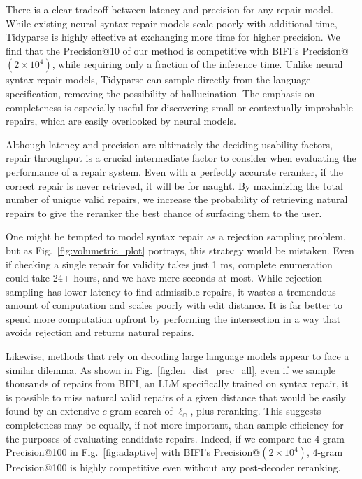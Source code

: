 \documentclass[sigplan,acmsmall,nonacm,screen]{acmart}\settopmatter{printfolios=false,printccs=false,printacmref=false}
\begin{document}
There is a clear tradeoff between latency and precision for any repair model. While existing neural syntax repair models scale poorly with additional time, Tidyparse is highly effective at exchanging more time for higher precision. We find that the Precision@10 of our method is competitive with BIFI's Precision@$(2\times 10^4)$, while requiring only a fraction of the inference time. Unlike neural syntax repair models, Tidyparse can sample directly from the language specification, removing the possibility of hallucination. The emphasis on completeness is especially useful for discovering small or contextually improbable repairs, which are easily overlooked by neural models.

Although latency and precision are ultimately the deciding usability factors, repair throughput is a crucial intermediate factor to consider when evaluating the performance of a repair system. Even with a perfectly accurate reranker, if the correct repair is never retrieved, it will be for naught. By maximizing the total number of unique valid repairs, we increase the probability of retrieving natural repairs to give the reranker the best chance of surfacing them to the user.

One might be tempted to model syntax repair as a rejection sampling problem, but as Fig.~\ref{fig:volumetric_plot} portrays, this strategy would be mistaken. Even if checking a single repair for validity takes just 1 ms, complete enumeration could take 24+ hours, and we have mere seconds at most. While rejection sampling has lower latency to find admissible repairs, it wastes a tremendous amount of computation and scales poorly with edit distance. It is far better to spend more computation upfront by performing the intersection in a way that avoids rejection and returns natural repairs.

Likewise, methods that rely on decoding large language models appear to face a similar dilemma. As shown in Fig.~\ref{fig:len_dist_prec_all}, even if we sample thousands of repairs from BIFI, an LLM specifically trained on syntax repair, it is possible to miss natural valid repairs of a given distance that would be easily found by an extensive $c$-gram search of $\ell_\cap$, plus reranking. This suggests completeness may be equally, if not more important, than sample efficiency for the purposes of evaluating candidate repairs. Indeed, if we compare the 4-gram Precision@100 in Fig.~\ref{fig:adaptive} with BIFI's Precision@$(2\times 10^4)$, 4-gram Precision@100 is highly competitive even without any post-decoder reranking.
\end{document}
